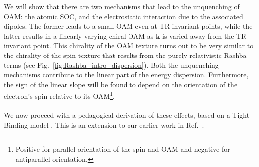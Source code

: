 We will show that there are two mechanisms that lead to the unquenching of OAM: the atomic SOC, and the electrostatic interaction due to the associated dipoles.
The former leads to a small OAM even at TR invariant points, while the latter results in a linearly varying chiral OAM as $\bm k$ is varied away from the TR invariant point.
This chirality of the OAM texture turns out to be very similar to the chirality of the spin texture that results from the purely relativistic Rashba terms (see Fig.~\ref{fig:Rashba_intro_dispersion}).
Both the unquenching mechanisms contribute to the linear part of the energy dispersion.
Furthermore, the sign of the linear slope will be found to depend on the orientation of the electron's spin relative to its OAM\footnote{Positive for parallel orientation of the spin and OAM and negative for antiparallel orientation.}.
\\\\
We now proceed with a pedagogical derivation of these effects, based on a Tight-Binding model \cite{Petersen2000,Kim2014,Go2016}. This is an extension to our earlier work in Ref.~\cite{Ponet2018}.

